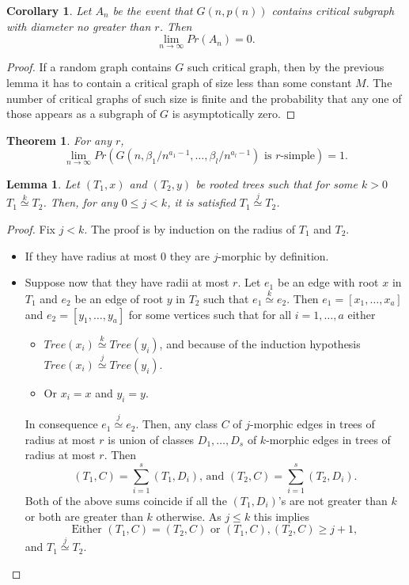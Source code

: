\documentclass[11pt,notitlepage]{report}
\newtheorem{theorem}{Theorem}[chapter]
\newtheorem{lemma}{Lemma}[chapter]
\newtheorem{corollary}{Corollary}[chapter]
\theoremstyle{definition}
\theoremstyle{remark}
\newcommand{\Ln}{\lim\limits_{n\to \infty}}
\newcommand{\morph}[1]{\stackrel{#1}{\simeq}}
\begin{document}
\begin{corollary}
	Let $A_n$ be the event that $G(n,p(n))$ contains critical 
	subgraph with diameter no greater than $r$. Then
	\[ \Ln Pr(A_n)=0. \]
\end{corollary}
\begin{proof}
	If a random graph contains $G$ such critical graph, then by the previous
	lemma it has to contain a critical graph of size less than some constant $M$.
	The number of critical graphs of such size is finite and the probability 
	that any one of those appears as a subgraph of $G$ is asymptotically zero.	 
\end{proof}


\begin{theorem} For any $r$,
	\[\Ln Pr(G(n,\beta_1/n^{a_1-1}, \dots,\beta_l/n^{a_l-1} ) \text{ is }r \text{-simple})=1 .\]
\end{theorem}

	
\begin{lemma} 
	Let $(T_1,x)$ and $(T_2,y)$ be rooted trees such that for some $k>0$ 
	$T_1 \morph{k} T_2$. Then, for any $0\leq j < k$, it is satisfied
	$T_1 \morph{j} T_2$.
\end{lemma}
\begin{proof}
	Fix $j<k$. The proof is by induction on the radius of $T_1$ and $T_2$.
	\begin{itemize}
		\item If they have radius at most $0$ they are $j$-morphic by definition. 
		\item Suppose now that they have radii at most $r$. Let $e_1$ be an edge with root
		$x$ in $T_1$ and $e_2$ be an edge of root $y$ in $T_2$ such that $e_1 \morph{k} e_2$.
		Then $e_1=[x_1,\dots,x_a]$ and $e_2=[y_1,\dots,y_a]$ for some vertices such that for all
		$i=1,\dots, a$ either 
		\begin{itemize}
			\item $Tree(x_i)\morph{k} Tree(y_i)$, and because of the induction hypothesis 
			$Tree(x_i)\morph{j} Tree(y_i)$. 
			\item Or $x_i=x$ and $y_i=y$.
		\end{itemize}
		In consequence $e_1\morph{j} e_2$. Then, any class $C$ 
		of $j$-morphic edges in trees of radius at most
		$r$ is union of classes $D_1,\dots, D_s$ of $k$-morphic edges in 
		trees of radius at most $r$. Then
		\[(T_1,C)=\sum_{i=1}^s (T_1, D_i) \text{, and }	(T_2,C)=\sum_{i=1}^s (T_2, D_i).\]	
	 	Both of the above sums coincide if all the $(T_1, D_i)$'s are not greater than $k$ or
	 	both are greater than $k$ otherwise. As $j\leq k$ this implies
	 	\[\text{Either }(T_1,C)=(T_2,C) \text{ or } (T_1,C),(T_2,C)\geq j+1 ,\]
	 	and $T_1\morph{j}T_2$. 		
	\end{itemize}
\end{proof}	
\end{document}
